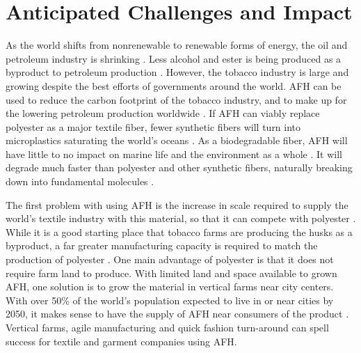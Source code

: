 \documentclass{article}
\begin{document}
\section{Anticipated Challenges and Impact}

As the world shifts from nonrenewable to renewable forms of energy, the oil and petroleum industry is shrinking \autocite{iucn}. Less alcohol and ester is being produced as a byproduct to petroleum production \autocite{iucn}\autocite{craftechindustries}. However, the tobacco industry is large and growing despite the best efforts of governments around the world. AFH can be used to reduce the carbon footprint of the tobacco industry, and to make up for the lowering petroleum production worldwide \autocite{afhfiber}. If AFH can viably replace polyester as a major textile fiber, fewer synthetic fibers will turn into microplastics saturating the world's oceans \autocite{microplasticrelease}\autocite{gesamp}. As a biodegradable fiber, AFH will have little to no impact on marine life and the environment as a whole \autocite{gesamp}\autocite{afhfiber}. It will degrade much faster than polyester and other synthetic fibers, naturally breaking down into fundamental molecules \autocite{naturalfiberprogressreport}.

The first problem with using AFH is the increase in scale required to supply the world's textile industry with this material, so that it can compete with polyester \autocite{afhfiber}. While it is a good starting place that tobacco farms are producing the husks as a byproduct, a far greater manufacturing capacity is required to match the production of polyester \autocite{afhfiber}. One main advantage of polyester is that it does not require farm land to produce. With limited land and space available to grown AFH, one solution is to grow the material in vertical farms near city centers. With over 50\% of the world's population expected to live in or near cities by 2050, it makes sense to have the supply of AFH near consumers of the product \autocite{globaltradeanalysis}. Vertical farms, agile manufacturing and quick fashion turn-around can spell success for textile and garment companies using AFH.
\end{document}
